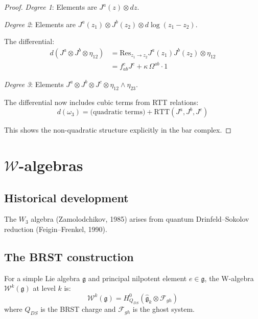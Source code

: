 \begin{proof}
\emph{Degree 1}: Elements are $J^a(z) \otimes dz$.

\emph{Degree 2}: Elements are $J^a(z_1) \otimes J^b(z_2) \otimes d\log(z_1 - z_2)$.

The differential:
\begin{align}
d(J^a \otimes J^b \otimes \eta_{12}) &= \text{Res}_{z_1 \to z_2} J^a(z_1)J^b(z_2) \otimes \eta_{12} \\
&= f_{ab}^c J^c + \kappa\, \Omega^{ab} \cdot 1
\end{align}

\emph{Degree 3}: Elements $J^a \otimes J^b \otimes J^c \otimes \eta_{12} \wedge \eta_{23}$.

The differential now includes cubic terms from RTT relations:
\[
d(\omega_3) = \text{(quadratic terms)} + \text{RTT}(J^a, J^b, J^c)
\]

This shows the non-quadratic structure explicitly in the bar complex. \qedhere
\end{proof}




\section{$\mathcal{W}$-algebras}

\subsection{Historical development}

The $W_3$ algebra (Zamolodchikov, 1985) arises from quantum Drinfeld--Sokolov reduction (Feigin--Frenkel, 1990).

\subsection{The BRST construction}

\begin{definition}
For a simple Lie algebra $\mathfrak{g}$ and principal nilpotent element $e \in \mathfrak{g}$, the W-algebra $\mathcal{W}^k(\mathfrak{g})$ at level $k$ is:
\[
\mathcal{W}^k(\mathfrak{g}) = H^0_{Q_{DS}}(\hat{\mathfrak{g}}_k \otimes \mathcal{F}_{gh})
\]
where $Q_{DS}$ is the BRST charge and $\mathcal{F}_{gh}$ is the ghost system.
\end{definition}


